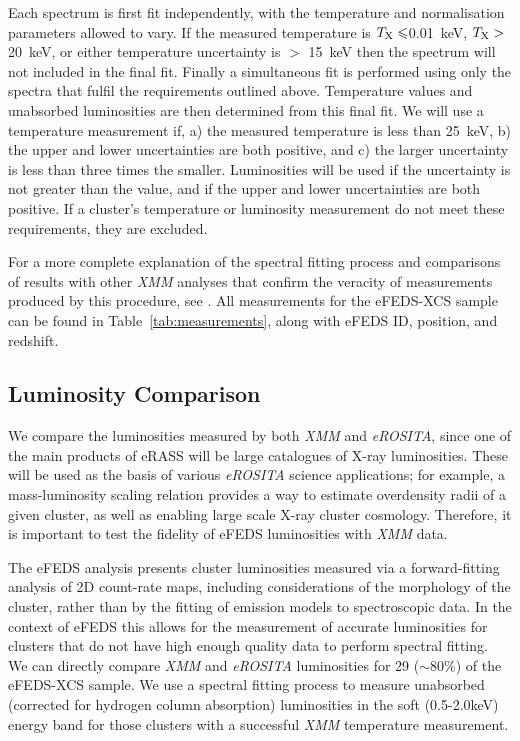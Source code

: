 \documentclass[fleqn,usenatbib]{mnras}
\begin{document}
Each spectrum is first fit independently, with the temperature and normalisation parameters allowed to vary. If the measured temperature is $T_{\rm{X}}\leq$0.01~keV, $T_{\rm{X}}>$20~keV, or either temperature uncertainty is $>$ 15~keV then the spectrum will not included in the final fit. Finally a simultaneous fit is performed using only the spectra that fulfil the requirements outlined above. Temperature values and unabsorbed luminosities are then determined from this final fit. We will use a temperature measurement if, a) the measured temperature is less than 25~keV, b) the upper and lower uncertainties are both positive, and c) the larger uncertainty is less than three times the smaller. Luminosities will be used if the uncertainty is not greater than the value, and if the upper and lower uncertainties are both positive. If a cluster's temperature or luminosity measurement do not meet these requirements, they are excluded.

For a more complete explanation of the spectral fitting process and comparisons of results with other {\em XMM} analyses that confirm the veracity of measurements produced by this procedure, see \cite{xcsmassmethod}. All measurements for the eFEDS-XCS sample can be found in Table~\ref{tab:measurements}, along with eFEDS ID, position, and redshift.

\subsection{Luminosity Comparison}
\label{subsec:lumcomp}

We compare the luminosities measured by both {\em XMM} and {\em eROSITA}, since one of the main products of eRASS will be large catalogues of X-ray luminosities. These will be used as the basis of various {\em eROSITA} science applications; for example, a mass-luminosity scaling relation \citep[such as the one recently produced by][]{efedsmor} provides a way to estimate overdensity radii of a given cluster, as well as enabling large scale X-ray cluster cosmology. Therefore, it is important to test the fidelity of eFEDS luminosities with {\em XMM} data. 

The eFEDS analysis presents cluster luminosities measured via a forward-fitting analysis of 2D count-rate maps, including considerations of the morphology of the cluster, rather than by the fitting of emission models to spectroscopic data. In the context of eFEDS this allows for the measurement of accurate luminosities for clusters that do not have high enough quality data to perform spectral fitting. We can directly compare {\em XMM} and {\em eROSITA} luminosities for 29 (${\sim}$80\%) of the eFEDS-XCS sample. We use a spectral fitting process to measure unabsorbed (corrected for hydrogen column absorption) luminosities in the soft (0.5-2.0keV) energy band for those clusters with a successful {\em XMM} temperature measurement.
\end{document}
